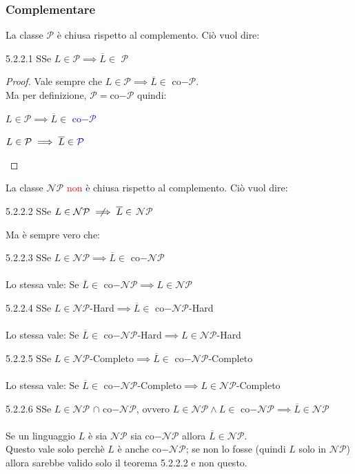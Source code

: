 \documentclass{article}  %
\theoremstyle{definition}
\begin{document}
\subsubsection{Complementare}
La classe $\mathcal{P}$ è chiusa rispetto al complemento. Ciò vuol dire:
\begin{theorem}{5.2.2.1}
	SSe $L \in \mathcal{P} \implies \overline{L} \in$ $\mathcal{P}$
	\footnotesize
	\begin{proof}
		Vale sempre che $L \in \mathcal{P} \implies \overline{L} \in$ co$-\mathcal{P}$. \\
		Ma per definizione, $\mathcal{P}=$co$-\mathcal{P}$ quindi:
		\begin{center}
			$L \in \mathcal{P} \implies \overline{L} \in$ \textcolor{blue}{co$-\mathcal{P}$}
		\end{center}
		\begin{center}
			$L \in \mathcal{P} \implies \overline{L} \in \textcolor{blue}{\mathcal{P}}$
		\end{center}
	\end{proof}
\end{theorem}
La classe $\mathcal{NP}$ \textcolor{red}{non} è chiusa rispetto al complemento. Ciò vuol dire:
\begin{theorem}{5.2.2.2}
	SSe $L \in \mathcal{NP} \centernot\implies \overline{L} \in$ $\mathcal{NP}$
\end{theorem}
Ma è sempre vero che:
\begin{theorem}{5.2.2.3}
	SSe $L \in \mathcal{NP} \implies \overline{L} \in$ co$-\mathcal{NP}$ \\ \\
	\footnotesize
	Lo stessa vale: Se $\overline{L} \in$ co$-\mathcal{NP} \implies L \in \mathcal{NP}$
\end{theorem}
\begin{theorem}{5.2.2.4}
	SSe $L \in \mathcal{NP}$-Hard$ \implies \overline{L} \in$ co$-\mathcal{NP}$-Hard \\ \\
	\footnotesize
	Lo stessa vale: Se $\overline{L} \in$ co$-\mathcal{NP}$-Hard$ \implies L \in \mathcal{NP}$-Hard
\end{theorem}
\begin{theorem}{5.2.2.5}
	SSe $L \in \mathcal{NP}$-Completo$ \implies \overline{L} \in$ co$-\mathcal{NP}$-Completo \\ \\
	\footnotesize
	Lo stessa vale: Se $\overline{L} \in$ co$-\mathcal{NP}$-Completo$ \implies L \in \mathcal{NP}$-Completo
\end{theorem}
\begin{theorem}{5.2.2.6}
	SSe $L\in \mathcal{NP}$ $\cap$ co$-\mathcal{NP}$, ovvero $L \in \mathcal{NP} \land L \in$ co$-\mathcal{NP} \implies \overline{L} \in \mathcal{NP}$ \\ \\
	\footnotesize
	Se un linguaggio $L$ è sia $\mathcal{NP}$ sia co$-\mathcal{NP}$ allora $\overline{L} \in \mathcal{NP}$. \\
	Questo vale solo perchè $L$ è anche co$-\mathcal{NP}$; se non lo fosse (quindi $L$ solo in $\mathcal{NP}$) allora sarebbe valido solo il teorema 5.2.2.2 e non questo.
\end{theorem}
\end{document}
